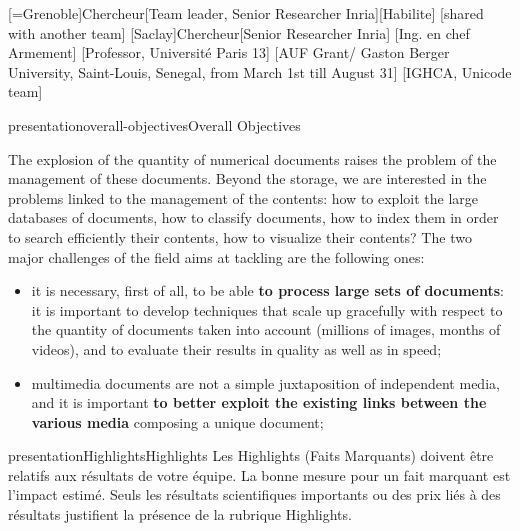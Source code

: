 \documentclass{ra2013}
\begin{document}
\begin{composition}

       [=Grenoble]{Chercheur}[Team leader, Senior Researcher Inria][Habilite]
       [shared with another team]
       [Saclay]{Chercheur}[Senior Researcher Inria]
       [Ing. en chef Armement]
       [Professor, Université Paris 13]
       [AUF Grant/ Gaston Berger University, Saint-Louis, Senegal, from March 1st till August 31]
       [IGHCA, Unicode team]
\end{composition}


\begin{module}{presentation}{overall-objectives}{Overall Objectives}

  The explosion of the quantity of numerical documents raises the problem
  of the management of these documents. Beyond the storage,
  we are interested in the problems linked to the management of the contents: 
  how to exploit the large databases of documents, how to classify documents, how to
  index them in order to search efficiently their contents, how to visualize
  their contents? 
  The two major challenges of the field  aims at tackling are the following ones:
  \begin{itemize} 
  \item it is necessary, first of all, to be able {\bf to
      process large sets of documents}: it is important to develop techniques
    that scale up gracefully with respect to the quantity of documents
    taken into account (millions of images, months of videos), and to evaluate
    their results in quality as well as in speed;
    
  \item  multimedia documents are not a simple juxtaposition of
    independent media, and it is important {\bf to better exploit the
      existing links between the various media} composing a unique
    document;
  \end{itemize}
\end{module}

\begin{module}{presentation}{Highlights}{Highlights}
Les  Highlights (Faits Marquants) doivent être relatifs aux résultats de votre équipe. La bonne mesure pour un fait marquant est l'impact estimé. Seuls les résultats scientifiques importants ou des prix liés à des résultats justifient la présence de la rubrique Highlights.
\end{module}
\end{document}

